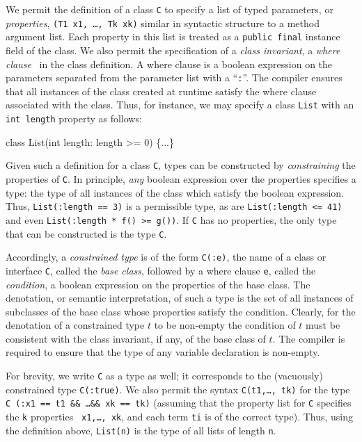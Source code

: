 We permit the definition of a class {\tt C} to specify
a list of typed parameters, or {\em properties},
{\tt (T1 x1, \ldots, Tk xk)} similar in syntactic structure to
a method argument list. Each
property in this list is treated as a {\tt public final} instance
field of the class.
We also permit the
specification of a {\em class invariant}, a
{\em where clause}~\cite{where-clauses}
in the class definition. A where
clause is a boolean expression on the parameters separated from the
parameter list with a ``{\tt :}''.  The compiler ensures that all
instances of the class created at runtime satisfy the where clause
associated with the class.
Thus, for instance, we may specify a class {\tt List} with an
{\tt int length} property as follows:
\begin{code}
  class List(int length: length >= 0) \{...\}
\end{code}

Given such a definition for a class {\tt C},
types can be constructed by {\em constraining} the properties of
{\tt C}.
In principle, {\em any} boolean expression over the
properties specifies a type: the type of all instances of the
class which satisfy the boolean expression. Thus,
{\tt List(:length == 3)} is a permissible type, as are
{\tt List(:length <= 41)} and even
{\tt List(:length * f() >= g())}.
If {\tt C} has no properties, the only type that can be
constructed is the type {\tt C}.

Accordingly, a {\em constrained type} is of the form {\tt C(:e)}, the name of
a class or interface {\tt C}, called the {\em base class}, followed by a
where clause {\tt e}, called the {\em condition}, a boolean expression
on the properties of the base class. 
The denotation, or
semantic interpretation, of such a type is the set of all instances
of subclasses of the base class whose properties satisfy the
condition.
Clearly, for the denotation of a constrained type $t$ to be
non-empty the condition of $t$ must be consistent with the class
invariant, if any, of the base class of $t$.  The compiler is required to
ensure that the type of any variable declaration is non-empty.

For brevity, we write {\tt C} as a type as well; it
corresponds to the (vacuously) constrained type {\tt C(:true)}.
We also permit the syntax {\tt C(t1,\ldots, tk)} for
the type {\tt C (:x1 == t1 \&\& \ldots \&\& xk == tk)} (assuming that
the property list for {\tt C} specifies the {\tt k} properties {\tt
x1,\ldots, xk}, and each term {\tt ti} is of the correct
type). Thus, using the definition above, {\tt List(n)} is the type of
all lists of length {\tt n}.

